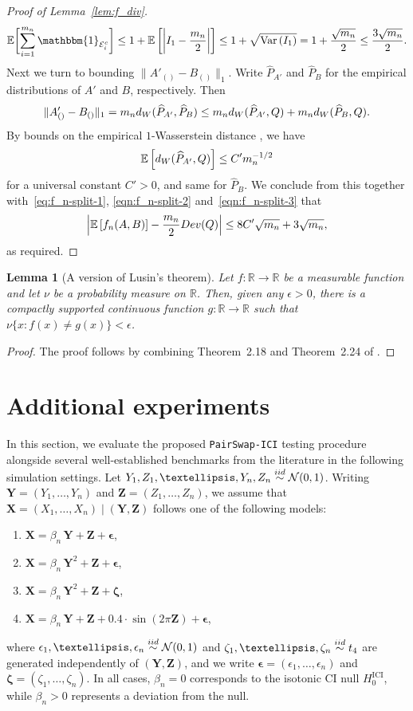 \documentclass[12pt]{article}
\newtheorem{lemma}[theorem]{Lemma}
\newcommand{\eps}{\varepsilon}
\newcommand{\EE}[1]{\mathbb{E}\left[{#1}\right]}
\newcommand{\VV}[1]{\mathrm{Var}\left({#1}\right)}
\newcommand{\one}[1]{{\mathbbm{1}}_{{#1}}}
\newcommand{\iidsim}{\stackrel{\textnormal{iid}}{\sim}}
\newcommand{\bX}{\mathbf{X}}
\newcommand{\bY}{\mathbf{Y}}
\newcommand{\bZ}{\mathbf{Z}}
\newcommand{\RR}{\mathbb{R}}
\newcommand{\bzeta}{\mathbf{\eps}}
\def\bzeta{{\boldsymbol{\zeta}}}
\def\beps{{\boldsymbol{\epsilon}}}
\begin{document}
\begin{proof}[Proof of Lemma~\ref{lem:f_div}]
\begin{align}\label{eqn:f_n-split-3}
    \mathbb{E}\biggl[\sum_{i=1}^{m_n}\one{\mathcal{E}_i^c}\biggr] \leq 1+ \EE{\biggl|I_1-\frac{m_n}{2}\biggr|}\leq 1+\sqrt{\VV{I_1}} = 1 + \frac{\sqrt{m_n}}{2}\leq \frac{3\sqrt{m_n}}{2}.
\end{align}
Next we turn to bounding $\|A'_{()}-B_{()}\|_1$.
Write $\widehat{P}_{A'}$ and $\widehat{P}_B$ for the empirical distributions of $A'$ and $B$, respectively. Then
\[\|A'_{()}-B_{()}\|_1 = m_n{\rm d}_{\rm W}(\widehat{P}_{A'},\widehat{P}_B) \leq m_n{\rm d}_{\rm W}(\widehat{P}_{A'},Q) + m_n{\rm d}_{\rm W}(\widehat{P}_B,Q).\]
By bounds on the empirical $1$-Wasserstein distance \citep[Theorem~3.1]{lei2020}, we have
\[
\EE{{\rm d}_{\rm W}(\widehat{P}_{A'},Q)}\leq C'm_n^{-1/2}
\]
for a universal constant $C' > 0$, and same for $\widehat{P}_B$.  We conclude from this together with~\eqref{eq:f_n-split-1}, \eqref{eqn:f_n-split-2} and~\eqref{eqn:f_n-split-3} that
\[
\Bigl|\EE{f_n(A,B)} - \frac{m_n}{2}\textnormal{Dev}(Q)\Bigr| \leq 8C'\sqrt{m_n} + 3\sqrt{m_n},
\]
as required.
\end{proof}
\begin{lemma}[A version of Lusin's theorem]\label{lem:lusin-theorem}
    Let $f:\RR\to\RR$ be a measurable function and let $\nu$ be a probability measure on $\RR$. Then, given any $\epsilon>0$, there is a compactly supported continuous function $g:\RR\to\RR$ such that $\nu\{x:f(x)\neq g(x)\}<\epsilon$.
\end{lemma}
\begin{proof}
    The proof follows by combining Theorem~2.18 and Theorem~2.24 of \citet{rudin1987real}.
\end{proof}


\section{Additional experiments}\label{app:additional_experiments}

In this section, we evaluate the proposed \texttt{PairSwap-ICI} testing procedure alongside several well-established benchmarks from the literature in the following simulation settings.  Let $Y_1,Z_1,\ldots,Y_n,Z_n\iidsim\mathcal{N}(0,1)$. Writing $\bY=(Y_1,\ldots,Y_n)$ and $\bZ=(Z_1,\ldots,Z_n)$, we assume that $\bX = (X_1,\ldots,X_n)\mid(\bY,\bZ)$ follows one of the following models:
\begin{enumerate}[(1)]
    \item $\bX = \beta_n\,\bY + \bZ + \beps$,
    \item $\bX = \beta_n\,\bY^2 + \bZ + \beps$,
    \item $\bX = \beta_n\,\bY^2 + \bZ + \bzeta$,
    \item $\bX = \beta_n\,\bY + \bZ + 0.4\cdot \sin (2\pi\bZ)+ \beps$,
\end{enumerate}
where $\epsilon_1,\ldots,\epsilon_n\iidsim\mathcal{N}(0,1)$ and $\zeta_1,\ldots,\zeta_n\iidsim t_4$ are generated independently of $(\bY,\bZ)$, and we write $\beps=(\epsilon_1,\ldots,\epsilon_n)$ and $\bzeta=(\zeta_1,\ldots,\zeta_n)$. In all cases, $\beta_n=0$ corresponds to the isotonic CI null $H_0^{\mathrm{ICI}}$, while $\beta_n>0$ represents a deviation from the null.
\end{document}
